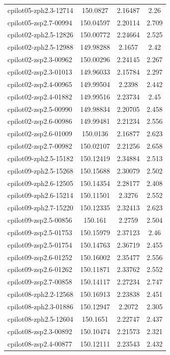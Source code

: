\documentclass[twocolumn,tight,times]{aastex63}
\begin{document}
\begin{center}
\begin{longtable}{l|c|c|c}
cpilot05-zph2.3-12714 & 150.0827 & 2.16487 & 2.26 \\
cpilot05-zsp2.7-00994 & 150.04597 & 2.20114 & 2.709 \\
cpilot02-zph2.5-12826 & 150.00772 & 2.24664 & 2.525 \\
cpilot02-zph2.5-12988 & 149.98288 & 2.1657 & 2.42 \\
cpilot02-zsp2.3-00962 & 150.00296 & 2.24145 & 2.267 \\
cpilot02-zsp2.3-01013 & 149.96033 & 2.15784 & 2.297 \\
cpilot02-zsp2.4-00965 & 149.99504 & 2.2398 & 2.442 \\
cpilot02-zsp2.4-01882 & 149.99516 & 2.23734 & 2.45 \\
cpilot02-zsp2.5-00990 & 149.98834 & 2.20705 & 2.458 \\
cpilot02-zsp2.6-00986 & 149.99481 & 2.21234 & 2.556 \\
cpilot02-zsp2.6-01009 & 150.0136 & 2.16877 & 2.623 \\
cpilot02-zsp2.7-00982 & 150.02107 & 2.21256 & 2.658 \\
cpilot09-zph2.5-15182 & 150.12419 & 2.34884 & 2.513 \\
cpilot09-zph2.5-15268 & 150.15688 & 2.30079 & 2.502 \\
cpilot09-zph2.6-12505 & 150.14354 & 2.28177 & 2.408 \\
cpilot09-zph2.6-15214 & 150.11501 & 2.3276 & 2.552 \\
cpilot09-zph2.7-15220 & 150.12335 & 2.32413 & 2.623 \\
cpilot09-zsp2.5-00856 & 150.161 & 2.2759 & 2.504 \\
cpilot09-zsp2.5-01753 & 150.15979 & 2.37123 & 2.46 \\
cpilot09-zsp2.5-01754 & 150.14763 & 2.36719 & 2.455 \\
cpilot09-zsp2.6-01252 & 150.16002 & 2.35477 & 2.556 \\
cpilot09-zsp2.6-01262 & 150.11871 & 2.33762 & 2.552 \\
cpilot09-zsp2.7-00858 & 150.14117 & 2.27234 & 2.747 \\
cpilot08-zph2.2-12568 & 150.16913 & 2.23838 & 2.451 \\
cpilot08-zph2.3-01886 & 150.12947 & 2.2072 & 2.305 \\
cpilot08-zph2.5-12604 & 150.1651 & 2.22747 & 2.437 \\
cpilot08-zsp2.3-00892 & 150.10474 & 2.21573 & 2.321 \\
cpilot08-zsp2.4-00877 & 150.12111 & 2.23543 & 2.432 \\

\end{longtable}
\end{center}
\end{document}
